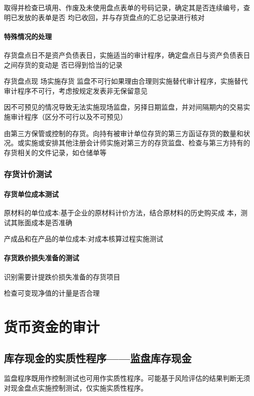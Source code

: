 \documentclass[UTF8,12pt]{ctexart}
\numberwithin{equation}{section} %
\numberwithin{figure}{section}
\numberwithin{table}{section}
\begin{document}
	取得并检查已填用、作废及未使用盘点表单的号码记录，确定其是否连续编号，查明已发放的表单是否 均已收回，并与存货盘点的汇总记录进行核对
	
	\paragraph{特殊情况的处理}
	存货盘点日不是资产负债表日，实施适当的审计程序，确定盘点日与资产负债表日之间存货的变动是 否已得到恰当的记录
	
	存货盘点现 场实施存货 监盘不可行如果理由合理则实施替代审计程序，实施替代审计程序不可行，考虑按规定发表非无保留意见
	
	因不可预见的情况导致无法实施现场监盘，另择日期监盘，并对间隔期内的交易实施审计程序（区分不可行以及不可预见）
	
	由第三方保管或控制的存货。向持有被审计单位存货的第三方函证存货的数量和状况。或实施或安排其他注册会计师实施对第三方的存货监盘、检查与第三方持有的存货相关的文件记录，如仓储单等
	
	\subsubsection{存货计价测试}
	\paragraph{存货单位成本测试}
	原材料的单位成本:基于企业的原材料计价方法，结合原材料的历史购买成 本，测试其账面成本是否准确 
	
	产成品和在产品的单位成本:对成本核算过程实施测试
	
	\paragraph{存货跌价损失准备的测试}识别需要计提跌价损失准备的存货项目    
	
	检查可变现净值的计量是否合理
	
	\newpage
	\section{货币资金的审计}
	
	\subsection{库存现金的实质性程序——监盘库存现金}
	监盘程序既用作控制测试也可用作实质性程序。可能基于风险评估的结果判断无须对现金盘点实施控制测试，仅实施实质性程序。
	
\end{document}
